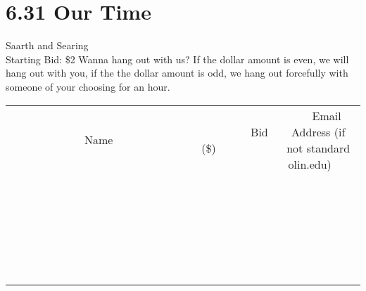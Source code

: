 \documentclass[11pt]{article}
\begin{document}
\section*{6.31 Our Time}
Saarth and Searing
\\
Starting Bid: \$2
\newline
Wanna hang out with us? If the dollar amount is even, we will hang out with you, if the the dollar amount is odd, we hang out forcefully with someone of your choosing for an hour.
\\[6ex]
\begin{tabular}{c c c}
~~~~~~~~~~~~~Name~~~~~~~~~~~~~ & ~~~~~~~~~Bid (\$)~~~~~~~~~  & ~~~Email Address (if not standard olin.edu)~~~\\
 & & \\
\hline
 & & \\
\hline
 & & \\
\hline
 & & \\
\hline
 & & \\
\hline
 & & \\
\hline
 & & \\
\hline
 & & \\
\hline
 & & \\
\hline
 & & \\
\hline
 & & \\
\hline
 & & \\
\hline
 & & \\
\hline
 & & \\
\hline
 & & \\
\hline
 & & \\
\hline
 & & \\
\hline
 & & \\
\hline
 & & \\
\hline
 & & \\
\hline
 & & \\
\hline
 & & \\
\hline
 & & \\
\hline
 & & \\
\hline
 & & \\
\hline
 & & \\
\hline
\end{tabular}
\newpage
\end{document}
